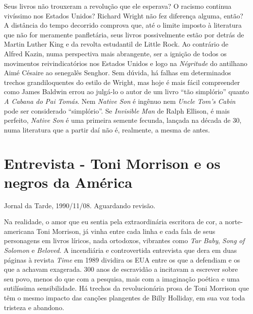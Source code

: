 \documentclass[
  letterpaper,
  DIV=11,
  numbers=noendperiod]{scrreprt}
\begin{document}
Seus livros não trouxeram a revolução que ele esperava? O racismo
continua vivíssimo nos Estados Unidos? Richard Wright não fez diferença
alguma, então? A distância do tempo decorrido comprova que, até o limite
imposto à literatura que não for meramente panfletária, seus livros
possivelmente estão por detrás de Martin Luther King e da revolta
estudantil de Little Rock. Ao contrário de Alfred Kazin, numa
perspectiva mais abrangente, ser a ignição de todos os movimentos
reivindicatórios nos Estados Unidos e logo na \emph{Négritude} do
antilhano Aimé Césaire ao senegalês Senghor. Sem dúvida, há falhas em
determinados trechos grandiloquentes do estilo de Wright, mas hoje é
mais fácil compreender como James Baldwin errou ao julgá-lo o autor de
um livro ``tão simplório'' quanto \emph{A Cabana do Pai Tomás}. Nem
\emph{Native Son} é ingênuo nem \emph{Uncle Tom's Cabin} pode ser
considerado ``simplório''. Se \emph{Invisible Man} de Ralph Ellison, é
mais perfeito, \emph{Native Son} é uma primeira semente fecunda, lançada
na década de 30, numa literatura que a partir daí não é, realmente, a
mesma de antes.

\chapter{Entrevista - Toni Morrison e os negros da
América}\label{entrevista---toni-morrison-e-os-negros-da-amuxe9rica}

Jornal da Tarde, 1990/11/08. Aguardando revisão.

\hfill\break

Na realidade, o amor que eu sentia pela extraordinária escritora de cor,
a norte-americana Toni Morrison, já vinha entre cada linha e cada fala
de seus personagens em livros líricos, nada ortodoxos, vibrantes como
\emph{Tar Baby}, \emph{Song of Solomon} e \emph{Beloved}. A incendiária
e controvertida entrevista que dera em duas páginas à revista
\emph{Time} em 1989 dividira os EUA entre os que a defendiam e os que a
achavam exagerada. 300 anos de escravidão a incitavam a escrever sobre
seu povo, menos do que com a pesquisa, mais com a imaginação poética e
uma sutilíssima sensibilidade. Há trechos da revolucionária prosa de
Toni Morrison que têm o mesmo impacto das canções plangentes de Billy
Holliday, em sua voz toda tristeza e abandono.
\end{document}
